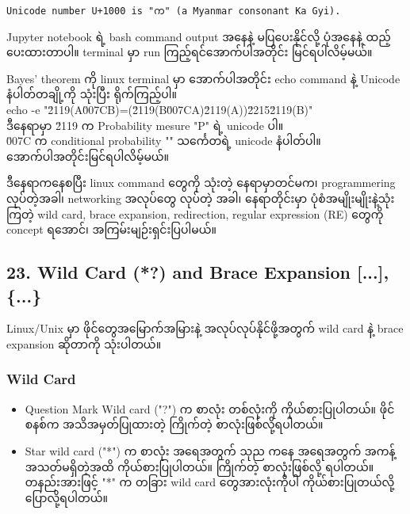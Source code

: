 \documentclass[11pt]{article}
\begin{document}
    \begin{Verbatim}[commandchars=\\\{\}]
Unicode number U+1000 is "က" (a Myanmar consonant Ka Gyi).

    \end{Verbatim}

    Jupyter notebook ရဲ့ bash command output အနေနဲ့ မပြပေးနိုင်လို့
ပုံအနေနဲ့ ထည့်ပေးထားတာပါ။ terminal မှာ run ကြည့်ရင်အောက်ပါအတိုင်း
မြင်ရပါလိမ့်မယ်။

    

    Bayes' theorem ကို linux terminal မှာ အောက်ပါအတိုင်း echo command နဲ့
Unicode နံပါတ်တချို့ကို သုံးပြီး ရိုက်ကြည့်ပါ။\\
echo -e "\u2119(A\u007CB)=(\u2119(B\u007CA)\u2119(A))\u2215\u2119(B)"\\
ဒီနေရာမှာ \u2119 က Probability mesure "P" ရဲ့ unicode ပါ။\\
\u007C က conditional probability "\textbar{}" သင်္ကေတရဲ့ unicode
နံပါတ်ပါ။\\
အောက်ပါအတိုင်းမြင်ရပါလိမ့်မယ်။

    

    ဒီနေရာကနေစပြီး linux command တွေကို သုံးတဲ့ နေရာမှာတင်မက၊ programmering
လုပ်တဲ့အခါ၊ networking အလုပ်တွေ လုပ်တဲ့ အခါ၊ နေရာတိုင်းမှာ
ပုံစံအမျိုးမျိုးနဲ့သုံးကြတဲ့ wild card, brace expansion, redirection,
regular expression (RE) တွေကို concept ရအောင်၊ အကြမ်းမျဉ်းရှင်းပြပါမယ်။

    \subsection{23. Wild Card (*?) and Brace Expansion {[}...{]},
\{...\}}\label{wild-card-and-brace-expansion-...-...}

Linux/Unix မှာ ဖိုင်တွေအမြောက်အမြားနဲ့ အလုပ်လုပ်နိုင်ဖို့အတွက် wild card
နဲ့ brace expansion ဆိုတာကို သုံးပါတယ်။

\subsubsection{Wild Card}\label{wild-card}

\begin{itemize}
\item
  Question Mark Wild card ("?") က စာလုံး တစ်လုံးကို ကိုယ်စားပြုပါတယ်။
  ဖိုင်စနစ်က အသိအမှတ်ပြုထားတဲ့ ကြိုက်တဲ့ စာလုံးဖြစ်လို့ရပါတယ်။
\item
  Star wild card ("*") က စာလုံး အရေအတွက် သုည ကနေ အရေအတွက်
  အကန့်အသတ်မရှိတဲ့အထိ ကိုယ်စားပြုပါတယ်။ ကြိုက်တဲ့ စာလုံးဖြစ်လို့
  ရပါတယ်။\\
  တနည်းအားဖြင့် "*" က တခြား wild card တွေအားလုံးကိုပါ ကိုယ်စားပြုတယ်လို့
  ပြောလို့ရပါတယ်။
\end{itemize}
\end{document}
